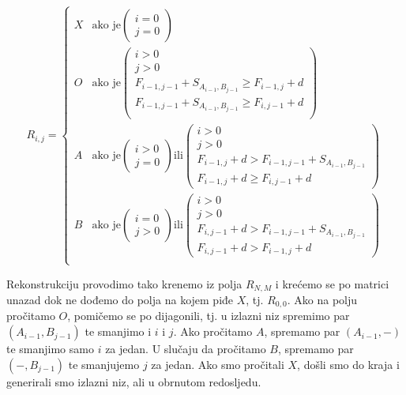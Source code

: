 \documentclass[times, utf8, zavrsni]{fer}
\begin{document}
$$
R_{i,j} = \left\{
	\begin{array}{ll}
		X & \mbox{ako je} \left( \begin{array}{l} i=0 \\ j=0 \end{array} \right) \\
		O & \mbox{ako je} \left( \begin{array}{l} i>0 \\ j>0 \\
				F_{i-1,j-1} + S_{A_{i-1}, B_{j-1}} \geq F_{i-1,j} + d \\
				F_{i-1,j-1} + S_{A_{i-1}, B_{j-1}} \geq F_{i,j-1} + d \\
			\end{array} \right) \\
		A & \mbox{ako je} \left( \begin{array}{l} i>0 \\ j=0 \end{array} \right)
			\mbox{ili} \left( \begin{array}{l} i>0 \\ j>0 \\
				F_{i-1,j} + d > F_{i-1,j-1} + S_{A_{i-1}, B_{j-1}} \\
				F_{i-1,j} + d \geq F_{i,j-1} + d
			\end{array} \right) \\
		B & \mbox{ako je} \left( \begin{array}{l} i=0 \\ j>0 \end{array} \right)
			\mbox{ili} \left( \begin{array}{l} i>0 \\ j>0 \\
				F_{i,j-1} + d > F_{i-1,j-1} + S_{A_{i-1}, B_{j-1}} \\
				F_{i,j-1} + d > F_{i-1,j} + d
			\end{array} \right) \\
	\end{array}
\right.
$$

Rekonstrukciju provodimo tako krenemo iz polja $R_{N,M}$ i krećemo se
po matrici unazad dok ne dođemo do polja na kojem piđe $X$, tj. $R_{0,0}$.
Ako na polju pročitamo $O$,
pomičemo se po dijagonili, tj. u izlazni niz spremimo par $(A_{i-1}, B_{j-1})$ te
smanjimo i $i$ i $j$. Ako pročitamo $A$, spremamo par $(A_{i-1}, -)$ te smanjimo
samo $i$ za jedan. U slučaju da pročitamo $B$, spremamo par $(-, B_{j-1})$ te
smanjujemo $j$ za jedan. Ako smo pročitali $X$, došli smo do kraja i generirali
smo izlazni niz, ali u obrnutom redosljedu. 
\end{document}
